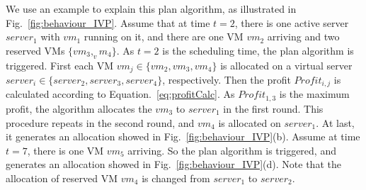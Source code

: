 \documentclass[10pt,journal]{IEEEtran}
\begin{document}
We use an example to explain this plan algorithm, as illustrated in Fig.~\ref{fig:behaviour_IVP}. Assume that at time $t=2$, there is one active server $server_1$ with $vm_1$ running on it, and there are one VM $vm_2$ arriving and two reserved VMs $\{vm_3,_vm_4\}$. As $t=2$ is the scheduling time, the plan algorithm is triggered. First each VM $vm_j{\in}\{vm_2,vm_3,vm_4\}$ is allocated on a virtual server $server_i{\in}\{server_2,server_3,server_4\}$, respectively. Then the profit $Profit_{i,j}$ is calculated according to Equation.~\ref{eq:profitCalc}. As $Profit_{1,3}$ is the maximum profit, the algorithm allocates the $vm_3$ to $server_1$ in the first round. This procedure repeats in the second round, and $vm_4$ is allocated on $server_1$. At last, it generates an allocation showed in Fig.~\ref{fig:behaviour_IVP}(b). Assume at time $t=7$, there is one VM $vm_5$ arriving. So the plan algorithm is triggered, and generates an allocation showed in Fig.~\ref{fig:behaviour_IVP}(d). Note that the allocation of reserved VM $vm_4$ is changed from $server_1$ to $server_2$.
\end{document}
